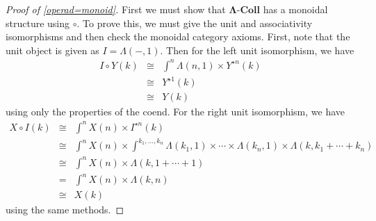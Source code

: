 \documentclass{amsbook} %
\newcommand{\mb}{\mathbf}
\newcommand{\ML}{\mathbf{\Lambda}}
\numberwithin{section}{chapter}
\begin{document}
\begin{proof}[Proof of \ref{operad=monoid}]
First we must show that $\ML\mbox{-}\mb{Coll}$ has a monoidal structure using $\circ$.  To prove this, we must give the unit and associativity isomorphisms and then check the monoidal category axioms.  First, note that the unit object is given as $I = \mathbb{\Lambda}(-,1)$.  Then for the left unit isomorphism, we have
\[
\begin{array}{rcl}
I \circ Y (k) & \cong & \int^{n} \mathbb{\Lambda}(n,1) \times Y^{\star n}(k) \\
& \cong & Y^{\star 1}(k) \\
& \cong & Y(k)
\end{array}
\]
using only the properties of the coend.  For the right unit isomorphism, we have
\[
\begin{array}{rcl}
X \circ I (k) & \cong & \int^{n} X(n) \times I^{\star n}(k) \\
& \cong & \int^{n} X(n) \times \int^{k_{1}, \ldots, k_{n}} \mathbb{\Lambda}(k_{1},1) \times \cdots \times \mathbb{\Lambda}(k_{n},1) \times \mathbb{\Lambda}(k, k_{1} + \cdots + k_{n}) \\
& \cong & \int^{n} X(n) \times \mathbb{\Lambda}(k,1+ \cdots +1) \\
& = & \int^{n} X(n) \times \mathbb{\Lambda}(k,n) \\
& \cong & X(k)
\end{array}
\]
using the same methods.


\end{proof}
\end{document}
